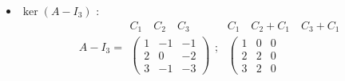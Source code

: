 \begin{example}[Trigonalisation]
\begin{itemize}
\[\begin{array}{c}
\begin{array}{rrr}
                            2 & 8 & -4 \\
                            -1 & 0 & 0
                        \end{array}
                    \right)
                \end{array}
                ; \; 
                \begin{array}{c}
                    \scriptstyle C_2 \quad C_1 + 3C_2 \quad C_1 + 5C_2 - 2C_3 \\
                    \left(
                        \begin{array}{rrr}
                            -1 & 0 & 0 \\
                            2 & 8 & 0 \\
                            -1 & 0 & 0
                        \end{array}
                    \right)
                \end{array}
            \] 
            On a donc $\ker (A + I_3) = \text{vect}((1,1,2))$. 
            La dimension du sous-espace caractéristique $E_{-1}$ associé à la 
            valeur propre $-1$ est égale à sa multiplicité, nous n'avons plus rien à faire ici. 
        \item $\ker (A - I_3)$ : 
            \[ 
                A - I_3 = 
                \begin{array}{c}
                    \scriptstyle C_1 \quad C_2 \quad C_3 \\
                    \left(
                        \begin{array}{rrr}
                        1 & -1 & -1 \\
                        2 & 0 & -2 \\
                        3 & -1 & -3
                        \end{array}
                    \right)
                    \end{array}
                    ; \; 
                    \begin{array}{c}
                        \scriptstyle C_1 \quad C_2 + C_1 \quad C_3 + C_1 \\
                        \left(
                        \begin{array}{rrr}
                        1 & 0 & 0 \\
                        2 & 2 & 0 \\
                        3 & 2 & 0
                    \end{array}

\end{array}\]
\end{itemize}
\end{example}
